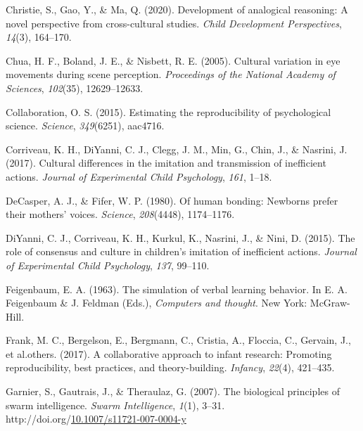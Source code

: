 \documentclass[10pt, letterpaper]{article}
\newenvironment{CSLReferences}%
  {}%
  {\par}
\begin{document}
\begin{CSLReferences}{1}{0}
\leavevmode{}%
Christie, S., Gao, Y., \& Ma, Q. (2020). Development of analogical
reasoning: A novel perspective from cross-cultural studies. \emph{Child
Development Perspectives}, \emph{14}(3), 164--170.

\leavevmode{}%
Chua, H. F., Boland, J. E., \& Nisbett, R. E. (2005). Cultural variation
in eye movements during scene perception. \emph{Proceedings of the
National Academy of Sciences}, \emph{102}(35), 12629--12633.

\leavevmode{}%
Collaboration, O. S. (2015). Estimating the reproducibility of
psychological science. \emph{Science}, \emph{349}(6251), aac4716.

\leavevmode{}%
Corriveau, K. H., DiYanni, C. J., Clegg, J. M., Min, G., Chin, J., \&
Nasrini, J. (2017). Cultural differences in the imitation and
transmission of inefficient actions. \emph{Journal of Experimental Child
Psychology}, \emph{161}, 1--18.

\leavevmode{}%
DeCasper, A. J., \& Fifer, W. P. (1980). Of human bonding: Newborns
prefer their mothers' voices. \emph{Science}, \emph{208}(4448),
1174--1176.

\leavevmode{}%
DiYanni, C. J., Corriveau, K. H., Kurkul, K., Nasrini, J., \& Nini, D.
(2015). The role of consensus and culture in children's imitation of
inefficient actions. \emph{Journal of Experimental Child Psychology},
\emph{137}, 99--110.

\leavevmode{}%
Feigenbaum, E. A. (1963). The simulation of verbal learning behavior. In
E. A. Feigenbaum \& J. Feldman (Eds.), \emph{Computers and thought}. New
York: McGraw-Hill.

\leavevmode{}%
Frank, M. C., Bergelson, E., Bergmann, C., Cristia, A., Floccia, C.,
Gervain, J., et al.others. (2017). A collaborative approach to infant
research: Promoting reproducibility, best practices, and
theory-building. \emph{Infancy}, \emph{22}(4), 421--435.

\leavevmode{}%
Garnier, S., Gautrais, J., \& Theraulaz, G. (2007). {The biological
principles of swarm intelligence}. \emph{Swarm Intelligence},
\emph{1}(1), 3--31.
http://doi.org/\href{https://doi.org/10.1007/s11721-007-0004-y}{10.1007/s11721-007-0004-y}


\end{CSLReferences}
\end{document}
